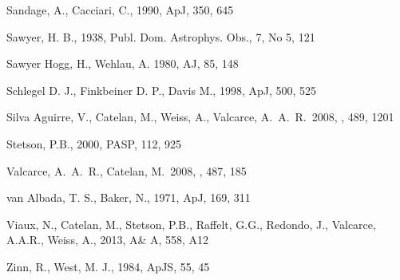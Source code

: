 \documentclass[journal]{rmaa}
\newcommand{\1}{\'{\i}}
\begin{document}
\begin{thebibliography}
\bibitem{} Sandage, A., Cacciari, C., 1990, ApJ, 350, 645

\bibitem{} Sawyer, H. B., 1938, Publ. Dom. Astrophys. Obs., 7, No 5, 121

\bibitem{} Sawyer Hogg, H., Wehlau, A.  1980, AJ, 85, 148

\bibitem{} Schlegel D. J., Finkbeiner D. P., Davis M., 1998, ApJ, 500, 525

\bibitem{} Silva Aguirre, V., Catelan, M., Weiss, A., Valcarce, A.~A.~R.\ 2008,
\aap, 489, 1201

\bibitem{} Stetson, P.B., 2000, PASP, 112, 925

\bibitem{} Valcarce, A.~A.~R., Catelan, M.\ 2008, \aap, 487, 185

\bibitem{} van Albada, T. S., Baker, N., 1971, ApJ, 169, 311

\bibitem{} Viaux, N., Catelan, M., Stetson, P.B., Raffelt, G.G., Redondo, J.,
Valcarce, A.A.R., Weiss, A., 2013, A\& A, 558, A12

\bibitem{} Zinn, R., West, M. J., 1984, ApJS, 55, 45

\end{thebibliography}
\end{document}
